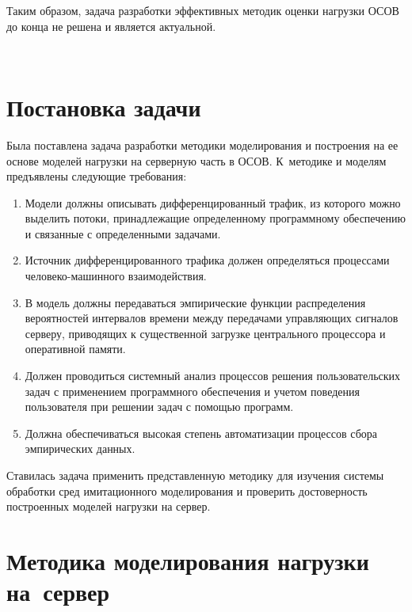 \begin{multicols}{2}
  Таким образом, задача разработки эффективных методик оценки нагрузки 
ОСОВ до конца не решена и является актуальной. 

\begin{figure*}[b] %
 \vspace*{1pt}
 \begin{center}
 \mbox{%
 \epsfxsize=164.097mm
 }
 \end{center}
 \vspace*{-9pt}
\end{figure*}
  
\section{Постановка задачи}
  
  Была поставлена задача разработки методики моделирования и построения на 
ее основе моделей нагрузки на серверную часть в ОСОВ. 
К~методике и моделям предъявлены следующие требования:
  \begin{enumerate}[1.]
\item Модели должны описывать дифференци\-ро\-ванный трафик, из которого 
можно выделить\linebreak
 потоки, принадлежащие определенному программному 
обеспечению и связанные с определенными задачами.
\item Источник дифференцированного трафика должен определяться 
процессами человеко-ма\-шин\-но\-го взаимодействия.
\item В модель должны передаваться эмпирические функции распределения 
вероятностей интервалов времени между передачами управляющих сигналов 
серверу, приводящих к существенной загрузке центрального процессора и 
оперативной памяти.
\item Должен проводиться системный анализ процессов решения 
пользовательских задач с применением программного обеспечения и учетом поведения 
пользователя при решении задач с по\-мощью программ.
\item Должна обеспечиваться высокая степень автоматизации процессов сбора 
эмпирических данных.
\end{enumerate}

  Ставилась задача применить представленную методику для изучения системы 
обработки сред имитационного моделирования и проверить достоверность 
построенных моделей нагрузки на сервер.
  
\section{Методика моделирования нагрузки на~сервер}
  

\end{multicols}
